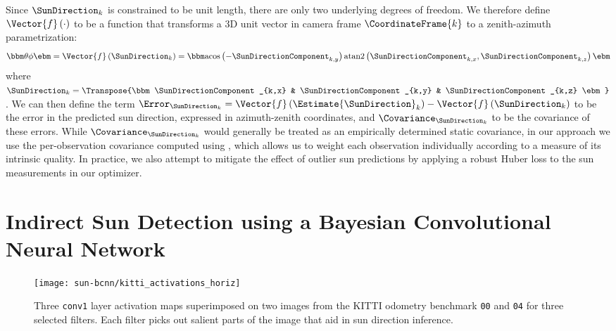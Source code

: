 Since $\SunDirection_k$ is constrained to be unit length, there are only two underlying degrees of freedom.
We therefore define $\Vector{f}\left(\cdot\right)$ to be a function that transforms a 3D unit vector in camera frame $\CoordinateFrame{k}$ to a zenith-azimuth parametrization:
\begin{equation} \label{eq:vec-to-az-zen}
	\bbm \theta \\ \phi \ebm
    = \Vector{f} \left( \SunDirection_k \right)
    = \bbm \text{acos}\left( -\SunDirectionComponent_{k,y} \right) \\ \text{atan2}\left(\SunDirectionComponent_{k,x}, \SunDirectionComponent_{k,z} \right) \ebm
\end{equation}
where $\SunDirection_k = \Transpose{\bbm \SunDirectionComponent_{k,x} & \SunDirectionComponent_{k,y} & \SunDirectionComponent_{k,z} \ebm}$.
We can then define the term $\Error_{\SunDirection_k} = \Vector{f}\left(\Estimate{\SunDirection}_k\right) - \Vector{f}\left(\SunDirection_k\right)$ to be the error in the predicted sun direction, expressed in azimuth-zenith coordinates, and $\Covariance_{\SunDirection_k}$ to be the covariance of these errors.
While $\Covariance_{\SunDirection_k}$ would generally be treated as an empirically determined static covariance, in our approach we use the per-observation covariance computed using , which allows us to weight each observation individually according to a measure of its intrinsic quality.
In practice, we also attempt to mitigate the effect of outlier sun predictions by applying a robust Huber loss to the sun measurements in our optimizer.




\section{Indirect Sun Detection using a Bayesian Convolutional Neural Network} \label{sec:sun-bcnn}

\begin{figure}
    \centering
    \texttt{[image: sun-bcnn/kitti\_activations\_horiz]}
    \caption{Three \texttt{conv1} layer activation maps superimposed on two images from the KITTI odometry benchmark \citep{Geiger2012-fq} \texttt{00} and \texttt{04} for three selected filters. Each filter picks out salient parts of the image that aid in sun direction inference.}
    \label{fig:sun-bcnn_kitti_cnn_activations}
\end{figure}


